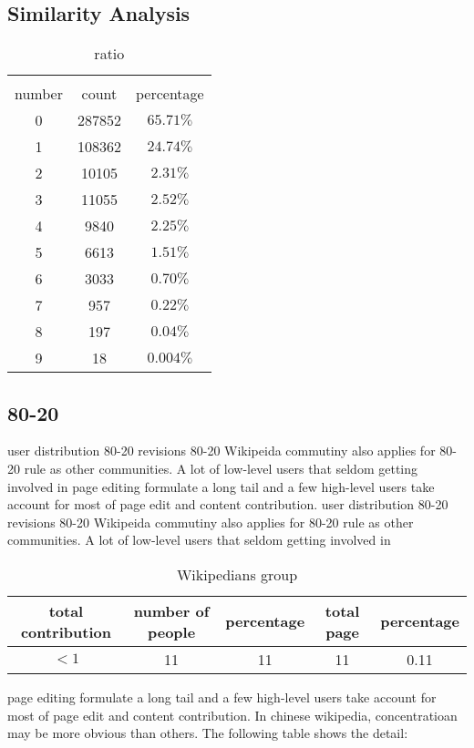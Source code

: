 \documentclass{elsarticle}
\begin{document}
\subsection{Similarity Analysis}
\label{sec:similarity-analysis}

\begin{table}
    \centering
    \caption{ratio}
    \begin{tabular}[center]{|c|c|c|}
      \hline\\
      number & count & percentage \\\hline
      0 & 287852& $65.71\%$\\\hline
      1 & 108362& $24.74\%$\\\hline
      2 & 10105& $2.31\%$\\\hline
      3 & 11055& $2.52\%$\\\hline
      4 & 9840&$2.25\%$ \\\hline
      5 & 6613& $1.51\%$\\\hline
      6 & 3033& $0.70\%$\\\hline
      7 & 957& $0.22\%$\\\hline
      8 & 197& $0.04\%$\\\hline
      9 & 18& $0.004\%$\\\hline
     
    \end{tabular}
   
 \end{table}
  
\subsection{80-20}
\label{sec:80-20}
user distribution 80-20
revisions 80-20
Wikipeida commutiny also applies for 80-20 rule as other
communities. A lot of low-level users that seldom getting involved in
page editing formulate a long tail and a few high-level users take
account for most of page edit and content contribution.
\label{sec:80-20}
user distribution 80-20
revisions 80-20
Wikipeida commutiny also applies for 80-20 rule as other
communities. A lot of low-level users that seldom getting involved in
\begin{table}[tb]
  \centering
  \caption{Wikipedians group}
  \begin{tabular}[center]{|c|c|c|c|c|}
    \hline
    total contribution&number of people&percentage&total page&percentage
    \\\hline
    $< 1$&11&11&11&0.11\\\hline
  \end{tabular}

\end{table}
page editing formulate a long tail and a few high-level users take
account for most of page edit and content contribution. In chinese
wikipedia, concentratioan may be more obvious than others. The
following table shows the detail:
\end{document}
